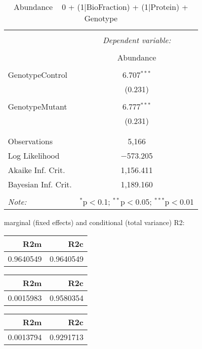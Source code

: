 \documentclass[11pt]{report}
\begin{document}
\begin{table}[!htbp] \centering 
  \caption{Abundance ~ 0 + (1|BioFraction) + (1|Protein) + Genotype} 
  \label{} 
\begin{tabular}{@{\extracolsep{5pt}}lc} 
\\[-1.8ex]\hline 
\hline \\[-1.8ex] 
 & \multicolumn{1}{c}{\textit{Dependent variable:}} \\ 
\cline{2-2} 
\\[-1.8ex] & Abundance \\ 
\hline \\[-1.8ex] 
 GenotypeControl & 6.707$^{***}$ \\ 
  & (0.231) \\ 
  & \\ 
 GenotypeMutant & 6.777$^{***}$ \\ 
  & (0.231) \\ 
  & \\ 
\hline \\[-1.8ex] 
Observations & 5,166 \\ 
Log Likelihood & $-$573.205 \\ 
Akaike Inf. Crit. & 1,156.411 \\ 
Bayesian Inf. Crit. & 1,189.160 \\ 
\hline 
\hline \\[-1.8ex] 
\textit{Note:}  & \multicolumn{1}{r}{$^{*}$p$<$0.1; $^{**}$p$<$0.05; $^{***}$p$<$0.01} \\ 
\end{tabular} 
\end{table} 
marginal (fixed effects) and conditional (total variance) R2:

\begin{tabular}{r|r}
\hline
R2m & R2c\\
\hline
0.9640549 & 0.9640549\\
\hline
\end{tabular}

\begin{tabular}{r|r}
\hline
R2m & R2c\\
\hline
0.0015983 & 0.9580354\\
\hline
\end{tabular}

\begin{tabular}{r|r}
\hline
R2m & R2c\\
\hline
0.0013794 & 0.9291713\\
\hline
\end{tabular}
\end{document}
